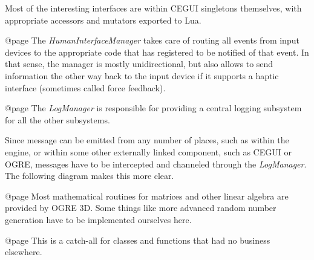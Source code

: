 Most of the interesting interfaces are within CEGUI singletons themselves, with appropriate accessors and mutators exported to Lua.

    {}

@page 
The {\sl HumanInterfaceManager} takes care of routing all events from input devices to the appropriate code that has registered to be notified of that event. In that sense, the manager is mostly unidirectional, but also allows to send information the other way back to the input device if it supports a haptic interface (sometimes called force feedback).

    {}

@page 
The {\sl LogManager} is responsible for providing a central logging subsystem for all the other subsystems.

    {}
    
Since message can be emitted from any number of places, such as within the engine, or within some other externally linked component, such as CEGUI or OGRE, messages have to be intercepted and channeled through the {\sl LogManager}. The following diagram makes this more clear.

    {}

@page 
Most mathematical routines for matrices and other linear algebra are provided by OGRE 3D. Some things like more advanced random number generation have to be implemented ourselves here.

    {}

@page 
This is a catch-all for classes and functions that had no business elsewhere.

    {}

